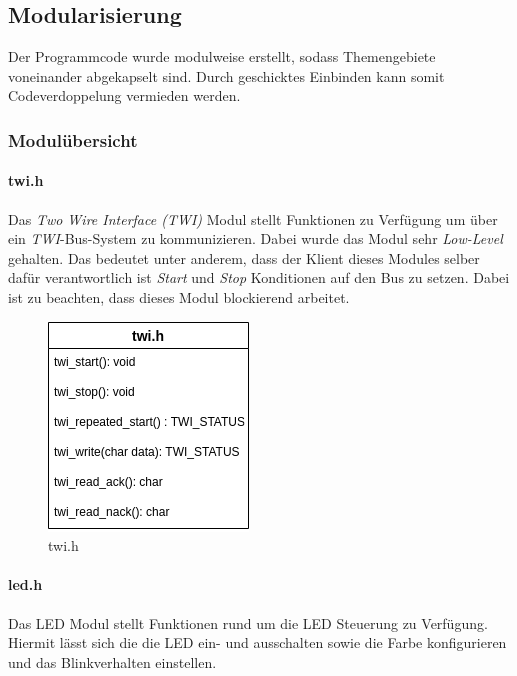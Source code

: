 \subsection{Modularisierung}
    Der Programmcode wurde modulweise erstellt, sodass Themengebiete 
    voneinander abgekapselt sind. Durch geschicktes Einbinden kann somit
    Codeverdoppelung vermieden werden.

    \subsubsection{Modulübersicht}

        \paragraph{twi.h}
            Das \textit{Two Wire Interface (TWI)} Modul stellt
            Funktionen zu Verfügung um über ein \textit{TWI}-Bus-System zu 
            kommunizieren. Dabei wurde das Modul sehr \textit{Low-Level}
            gehalten. Das bedeutet unter anderem, dass der Klient dieses Modules 
            selber dafür verantwortlich ist \textit{Start} und \textit{Stop} 
            Konditionen auf den Bus zu setzen. Dabei ist zu beachten, dass dieses
            Modul blockierend arbeitet.

            \begin{figure}[H]
                \centering
                \includegraphics[scale=0.6]{img/twi.png}
                \caption{twi.h}
            \end{figure}

        \paragraph{led.h}
            Das LED Modul stellt Funktionen rund um die LED Steuerung zu Verfügung.
            Hiermit lässt sich die die LED ein- und ausschalten sowie die Farbe
            konfigurieren und das Blinkverhalten einstellen.


